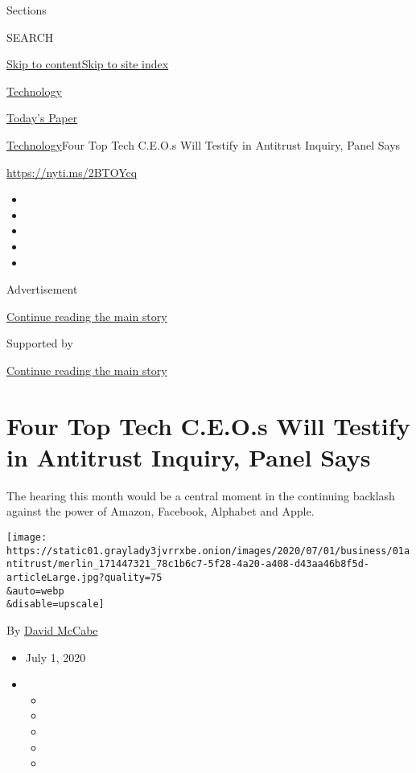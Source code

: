 Sections

SEARCH

\protect\hyperlink{site-content}{Skip to
content}\protect\hyperlink{site-index}{Skip to site index}

\href{https://www.nytimes3xbfgragh.onion/section/technology}{Technology}

\href{https://myaccount.nytimes3xbfgragh.onion/auth/login?response_type=cookie\&client_id=vi}{}

\href{https://www.nytimes3xbfgragh.onion/section/todayspaper}{Today's
Paper}

\href{/section/technology}{Technology}\textbar{}Four Top Tech C.E.O.s
Will Testify in Antitrust Inquiry, Panel Says

\href{https://nyti.ms/2BTOYcq}{https://nyti.ms/2BTOYcq}

\begin{itemize}
\item
\item
\item
\item
\item
\end{itemize}

Advertisement

\protect\hyperlink{after-top}{Continue reading the main story}

Supported by

\protect\hyperlink{after-sponsor}{Continue reading the main story}

\hypertarget{four-top-tech-ceos-will-testify-in-antitrust-inquiry-panel-says}{%
\section{Four Top Tech C.E.O.s Will Testify in Antitrust Inquiry, Panel
Says}\label{four-top-tech-ceos-will-testify-in-antitrust-inquiry-panel-says}}

The hearing this month would be a central moment in the continuing
backlash against the power of Amazon, Facebook, Alphabet and Apple.

\texttt{[image: https://static01.graylady3jvrrxbe.onion/images/2020/07/01/business/01antitrust/merlin\_171447321\_78c1b6c7-5f28-4a20-a408-d43aa46b8f5d-articleLarge.jpg?quality=75\\\&auto=webp\\\&disable=upscale]}

By \href{https://www.nytimes3xbfgragh.onion/by/david-mccabe}{David
McCabe}

\begin{itemize}
\item
  July 1, 2020
\item
  \begin{itemize}
  \item
  \item
  \item
  \item
  \item
  \end{itemize}
\end{itemize}

